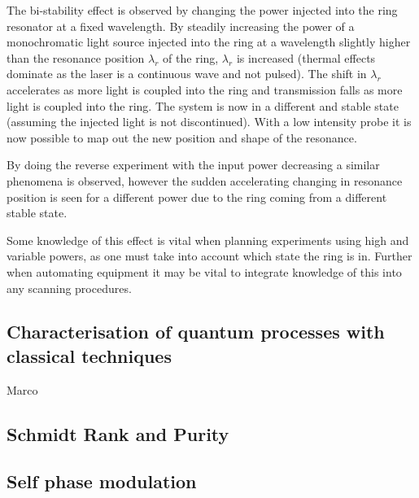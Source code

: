 The bi-stability effect is observed by changing the power injected into the ring resonator at a fixed wavelength. By steadily increasing the power of a monochromatic light source injected into the ring at a wavelength slightly higher than the resonance position $\lambda_{r}$ of the ring, $\lambda_{r}$ is increased (thermal effects dominate as the laser is a continuous wave and not pulsed). The shift in $\lambda_{r}$ accelerates as more light is coupled into the ring and transmission falls as more light is coupled into the ring. The system is now in a different and stable state (assuming the injected light is not discontinued). With a low intensity probe it is now possible to map out the new position and shape of the resonance.

By doing the reverse experiment with the input power decreasing a similar phenomena is observed, however the sudden accelerating changing in resonance position is seen for a different power due to the ring coming from a different stable state. 

Some knowledge of this effect is vital when planning experiments using high and variable powers, as one must take into account which state the ring is in. Further when automating equipment it may be vital to integrate knowledge of this into any scanning procedures. 

\subsection{Characterisation of quantum processes with classical techniques}
Marco \cite{helt_spontaneous_2010}

\subsection{Schmidt Rank and Purity}

\subsection{Self phase modulation}